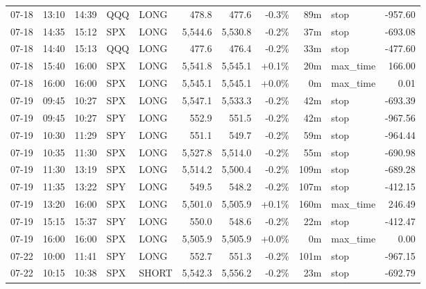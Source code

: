 \documentclass[11pt,a4paper,twoside]{article}
\begin{document}
\begin{center}
\begin{longtable}{>{\color{txtmain}}l l l l l r r r r >{\color{txtmain}}l r}
07-18 & 13:10 & 14:39 & QQQ & LONG & 478.8 & 477.6 & \textcolor{lossred}{-0.3\%} & 89m & stop & \textcolor{lossred}{-957.60} \\
07-18 & 14:35 & 15:12 & SPX & LONG & 5,544.6 & 5,530.8 & \textcolor{lossred}{-0.2\%} & 37m & stop & \textcolor{lossred}{-693.08} \\
07-18 & 14:40 & 15:13 & QQQ & LONG & 477.6 & 476.4 & \textcolor{lossred}{-0.2\%} & 33m & stop & \textcolor{lossred}{-477.60} \\
07-18 & 15:40 & 16:00 & SPX & LONG & 5,541.8 & 5,545.1 & \textcolor{wingreen}{+0.1\%} & 20m & max\_time & \textcolor{wingreen}{166.00} \\
07-18 & 16:00 & 16:00 & SPX & LONG & 5,545.1 & 5,545.1 & \textcolor{wingreen}{+0.0\%} & 0m & max\_time & \textcolor{wingreen}{0.01} \\
07-19 & 09:45 & 10:27 & SPX & LONG & 5,547.1 & 5,533.3 & \textcolor{lossred}{-0.2\%} & 42m & stop & \textcolor{lossred}{-693.39} \\
07-19 & 09:45 & 10:27 & SPY & LONG & 552.9 & 551.5 & \textcolor{lossred}{-0.2\%} & 42m & stop & \textcolor{lossred}{-967.56} \\
07-19 & 10:30 & 11:29 & SPY & LONG & 551.1 & 549.7 & \textcolor{lossred}{-0.2\%} & 59m & stop & \textcolor{lossred}{-964.44} \\
07-19 & 10:35 & 11:30 & SPX & LONG & 5,527.8 & 5,514.0 & \textcolor{lossred}{-0.2\%} & 55m & stop & \textcolor{lossred}{-690.98} \\
07-19 & 11:30 & 13:19 & SPX & LONG & 5,514.2 & 5,500.4 & \textcolor{lossred}{-0.2\%} & 109m & stop & \textcolor{lossred}{-689.28} \\
07-19 & 11:35 & 13:22 & SPY & LONG & 549.5 & 548.2 & \textcolor{lossred}{-0.2\%} & 107m & stop & \textcolor{lossred}{-412.15} \\
07-19 & 13:20 & 16:00 & SPX & LONG & 5,501.0 & 5,505.9 & \textcolor{wingreen}{+0.1\%} & 160m & max\_time & \textcolor{wingreen}{246.49} \\
07-19 & 15:15 & 15:37 & SPY & LONG & 550.0 & 548.6 & \textcolor{lossred}{-0.2\%} & 22m & stop & \textcolor{lossred}{-412.47} \\
07-19 & 16:00 & 16:00 & SPX & LONG & 5,505.9 & 5,505.9 & \textcolor{wingreen}{+0.0\%} & 0m & max\_time & \textcolor{wingreen}{0.00} \\
07-22 & 10:00 & 11:41 & SPY & LONG & 552.7 & 551.3 & \textcolor{lossred}{-0.2\%} & 101m & stop & \textcolor{lossred}{-967.15} \\
07-22 & 10:15 & 10:38 & SPX & SHORT & 5,542.3 & 5,556.2 & \textcolor{lossred}{-0.2\%} & 23m & stop & \textcolor{lossred}{-692.79} \\

\end{longtable}
\end{center}
\end{document}
